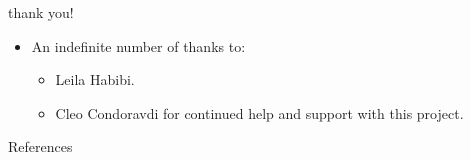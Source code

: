 \documentclass[10pt]{beamer}
\begin{document}
\begin {frame} {thank you!} 
\begin {itemize}
\item An indefinite number of thanks to: 
\begin {itemize}
\item Leila Habibi. 
\item Cleo Condoravdi for continued help and support with this project.
\end {itemize}
\end {itemize}
\end {frame} 


\begin {frame} {References} 


\end {frame} 
\end{document}
